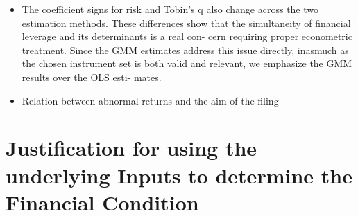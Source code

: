 \documentclass[12pt]{article}
\begin{document}
\begin{itemize}
        \item The coefficient signs for risk and Tobin’s q also change across the two estimation methods. These differences show that the simultaneity of financial leverage and its determinants is a real con- cern requiring proper econometric treatment. Since the GMM estimates address this issue directly, inasmuch as the chosen instrument set is both valid and relevant, we emphasize the GMM results over the OLS esti- mates. \citep{MacKay2005}

        \item Relation between abnormal returns and the aim of the filing \citep{Brav2008}
    \end{itemize}

\section{Justification for using the underlying Inputs to determine the Financial Condition}
\end{document}
